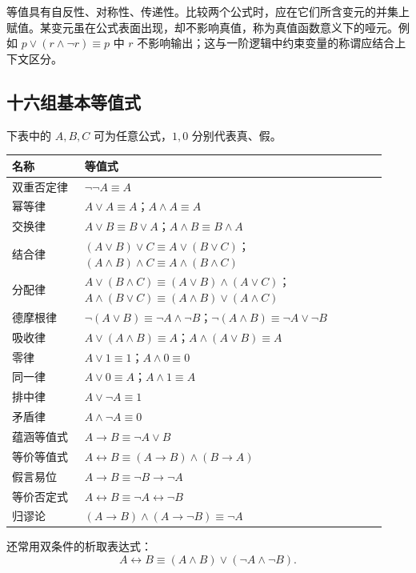 \documentclass[UTF8,fontset=none,zihao=-4,a4paper]{ctexart}
\renewcommand{\arraystretch}{1.35}
\begin{document}
等值具有自反性、对称性、传递性。比较两个公式时，应在它们所含变元的并集上赋值。某变元虽在公式表面出现，却不影响真值，称为真值函数意义下的哑元。例如 $p\lor(r\land\neg r)\equiv p$ 中 $r$ 不影响输出；这与一阶逻辑中约束变量的称谓应结合上下文区分。

\subsection{十六组基本等值式}
下表中的 $A,B,C$ 可为任意公式，$1,0$ 分别代表真、假。
\begingroup
\renewcommand{\arraystretch}{1.12}
\begin{longtable}{p{0.18\linewidth}p{0.75\linewidth}}
\toprule 名称 & 等值式\\\midrule\endhead
双重否定律 & $\neg\neg A\equiv A$\\
幂等律 & $A\lor A\equiv A$；$A\land A\equiv A$\\
交换律 & $A\lor B\equiv B\lor A$；$A\land B\equiv B\land A$\\
结合律 & $(A\lor B)\lor C\equiv A\lor(B\lor C)$；\newline $(A\land B)\land C\equiv A\land(B\land C)$\\
分配律 & $A\lor(B\land C)\equiv(A\lor B)\land(A\lor C)$；\newline $A\land(B\lor C)\equiv(A\land B)\lor(A\land C)$\\
德摩根律 & $\neg(A\lor B)\equiv\neg A\land\neg B$；\newline $\neg(A\land B)\equiv\neg A\lor\neg B$\\
吸收律 & $A\lor(A\land B)\equiv A$；$A\land(A\lor B)\equiv A$\\
零律 & $A\lor1\equiv1$；$A\land0\equiv0$\\
同一律 & $A\lor0\equiv A$；$A\land1\equiv A$\\
排中律 & $A\lor\neg A\equiv1$\\
矛盾律 & $A\land\neg A\equiv0$\\
蕴涵等值式 & $A\to B\equiv\neg A\lor B$\\
等价等值式 & $A\leftrightarrow B\equiv(A\to B)\land(B\to A)$\\
假言易位 & $A\to B\equiv\neg B\to\neg A$\\
等价否定式 & $A\leftrightarrow B\equiv\neg A\leftrightarrow\neg B$\\
归谬论 & $(A\to B)\land(A\to\neg B)\equiv\neg A$\\\bottomrule
\end{longtable}
\endgroup
还常用双条件的析取表达式：
\[
A\leftrightarrow B\equiv(A\land B)\lor(\neg A\land\neg B).
\]
\end{document}
